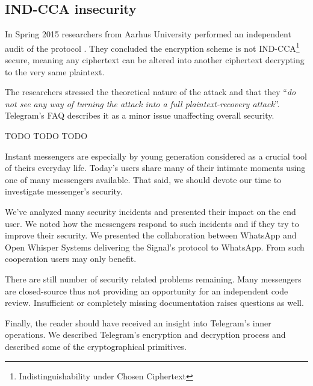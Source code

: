 \documentclass[thesis=M,english]{FITthesis}[2012/10/20]
\begin{document}
\subsection{IND-CCA insecurity}

In Spring 2015 researchers from Aarhus University performed an independent audit of the protocol \cite{telegram-aarhus}. They concluded the encryption scheme is not IND-CCA\footnote{Indistinguishability under Chosen Ciphertext} secure, meaning any ciphertext can be altered into another ciphertext decrypting to the very same plaintext.

The researchers stressed the theoretical nature of the attack and that they ``\emph{do not see any way of turning the attack into a full plaintext-recovery attack}''\cite{telegram-aarhus}. Telegram's FAQ describes it as a minor issue unaffecting overall security. \cite{telegram-techfaq}




\begin{conclusion}

TODO TODO TODO

Instant messengers are especially by young generation considered as a crucial tool of theirs everyday life. Today's users share many of their intimate moments using one of many messengers available. That said, we should devote our time to investigate messenger's security.

We've analyzed many security incidents and presented their impact on the end user. We noted how the messengers respond to such incidents and if they try to improve their security. We presented the collaboration between WhatsApp and Open Whisper Systems delivering the Signal's protocol to WhatsApp. From such cooperation users may only benefit.

There are still number of security related problems remaining. Many messengers are closed-source thus not providing an opportunity for an independent code review. Insufficient or completely missing documentation raises questions as well.

Finally, the reader should have received an insight into Telegram's inner operations. We described Telegram's encryption and decryption process and described some of the cryptographical primitives.

\end{conclusion}





\appendix

\end{document}
